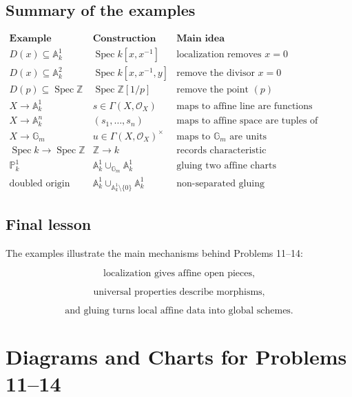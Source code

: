 \documentclass[12pt,a4paper]{article}
\newcommand{\Spec}{\operatorname{Spec}}
\theoremstyle{notespace}
\begin{document}
\subsection{Summary of the examples}

\[
\begin{array}{c|c|c}
	\textbf{Example} & \textbf{Construction} & \textbf{Main idea} \\
	\hline
	D(x)\subseteq\mathbb A^1_k
	&
	\Spec k[x,x^{-1}]
	&
	\text{localization removes }x=0
	\\
	\hline
	D(x)\subseteq\mathbb A^2_k
	&
	\Spec k[x,x^{-1},y]
	&
	\text{remove the divisor }x=0
	\\
	\hline
	D(p)\subseteq\Spec\mathbb Z
	&
	\Spec\mathbb Z[1/p]
	&
	\text{remove the point }(p)
	\\
	\hline
	X\to\mathbb A^1_k
	&
	s\in\Gamma(X,\mathcal O_X)
	&
	\text{maps to affine line are functions}
	\\
	\hline
	X\to\mathbb A^n_k
	&
	(s_1,\dots,s_n)
	&
	\text{maps to affine space are tuples of functions}
	\\
	\hline
	X\to\mathbb G_m
	&
	u\in\Gamma(X,\mathcal O_X)^\times
	&
	\text{maps to }\mathbb G_m\text{ are units}
	\\
	\hline
	\Spec k\to\Spec\mathbb Z
	&
	\mathbb Z\to k
	&
	\text{records characteristic}
	\\
	\hline
	\mathbb P^1_k
	&
	\mathbb A^1_k\cup_{\mathbb G_m}\mathbb A^1_k
	&
	\text{gluing two affine charts}
	\\
	\hline
	\text{doubled origin}
	&
	\mathbb A^1_k\cup_{\mathbb A^1_k\setminus\{0\}}\mathbb A^1_k
	&
	\text{non-separated gluing}
\end{array}
\]

\subsection{Final lesson}

The examples illustrate the main mechanisms behind Problems 11--14:

\[
\boxed{
	\text{localization gives affine open pieces,}
}
\]

\[
\boxed{
	\text{universal properties describe morphisms,}
}
\]

\[
\boxed{
	\text{and gluing turns local affine data into global schemes.}
}
\]

\section{Diagrams and Charts for Problems 11--14}
\end{document}
